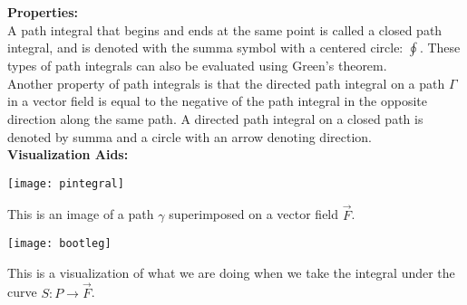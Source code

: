 \documentclass{article}
\begin{document}
\textbf{Properties:}\\
A path integral that begins and ends at the same point is called a closed path integral, and is denoted with the summa symbol with a centered circle: $\oint$. These types of path integrals can also be evaluated using Green's theorem.\\
Another property of path integrals is that the directed path integral on a path $\Gamma$ in a vector field is equal to the negative of the path integral in the opposite direction along the same path. A directed path integral on a closed path is denoted by summa and a circle with an arrow denoting direction.\\

\textbf{Visualization Aids:}
\begin{center}
\texttt{[image: pintegral]}
\end{center}
This is an image of a path $\gamma$ superimposed on a vector field $\vec{F}$.
\begin{center}
\texttt{[image: bootleg]}
\end{center}
This is a visualization of what we are doing when we take the integral under the curve $S:P\rightarrow\vec{F}$.
\end{document}
